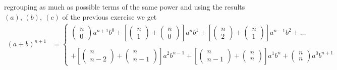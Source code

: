 regrouping as much as possible terms of the same power and using the results $(a),\, (b),\ (c)$ of the previous exercise we get
\begin{align*}
(a + b)^{n+1}&=\left\{\begin{array}{l}\left(\begin{matrix}n\\ 0\end{matrix}\right)a^{n+1}b^{0}+\left[\left(\begin{matrix}n\\ 1\end{matrix}\right)+\left(\begin{matrix}n\\ 0\end{matrix}\right)\right]a^{n}b^{1}+\left[\left(\begin{matrix}n\\ 2\end{matrix}\right)+\left(\begin{matrix}n\\ 1\end{matrix}\right)\right]a^{n-1}b^{2}+\dots \\\\
+\left[\left(\begin{matrix}n\\ n-2\end{matrix}\right)+\left(\begin{matrix}n\\ n-1\end{matrix}\right)\right]a^{2}b^{n-1}+\left[\left(\begin{matrix}n\\ n-1\end{matrix}\right)+\left(\begin{matrix}n\\ n\end{matrix}\right)\right]a^{1}b^{n}+\left(\begin{matrix}n\\ n\end{matrix}\right)a^{0}b^{n+1}\end{array}
\right.\\\\

\end{align*}
